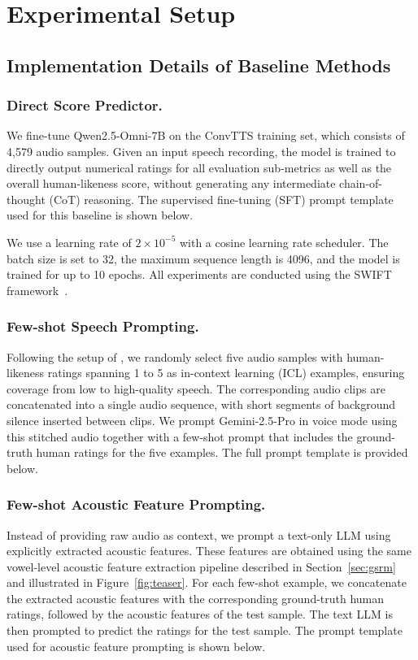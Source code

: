 \section{Experimental Setup} \label{sec:app-setting}

\subsection{Implementation Details of Baseline Methods}

\subsubsection{Direct Score Predictor.}
We fine-tune Qwen2.5-Omni-7B on the ConvTTS training set, which consists of 4,579 audio samples. Given an input speech recording, the model is trained to directly output numerical ratings for all evaluation sub-metrics as well as the overall human-likeness score, without generating any intermediate chain-of-thought (CoT) reasoning. The supervised fine-tuning (SFT) prompt template used for this baseline is shown below.

We use a learning rate of $2\times10^{-5}$ with a cosine learning rate scheduler. The batch size is set to 32, the maximum sequence length is 4096, and the model is trained for up to 10 epochs. All experiments are conducted using the SWIFT framework~\cite{zhao2024swiftascalablelightweightinfrastructure}.


\subsubsection{Few-shot Speech Prompting.}
Following the setup of \citet{manakul2025audiojudge}, we randomly select five audio samples with human-likeness ratings spanning 1 to 5 as in-context learning (ICL) examples, ensuring coverage from low to high-quality speech. The corresponding audio clips are concatenated into a single audio sequence, with short segments of background silence inserted between clips. We prompt Gemini-2.5-Pro in voice mode using this stitched audio together with a few-shot prompt that includes the ground-truth human ratings for the five examples. The full prompt template is provided below.


\subsubsection{Few-shot Acoustic Feature Prompting.}
Instead of providing raw audio as context, we prompt a text-only LLM using explicitly extracted acoustic features. These features are obtained using the same vowel-level acoustic feature extraction pipeline described in Section~\ref{sec:gsrm} and illustrated in Figure~\ref{fig:teaser}. For each few-shot example, we concatenate the extracted acoustic features with the corresponding ground-truth human ratings, followed by the acoustic features of the test sample. The text LLM is then prompted to predict the ratings for the test sample. The prompt template used for acoustic feature prompting is shown below.



